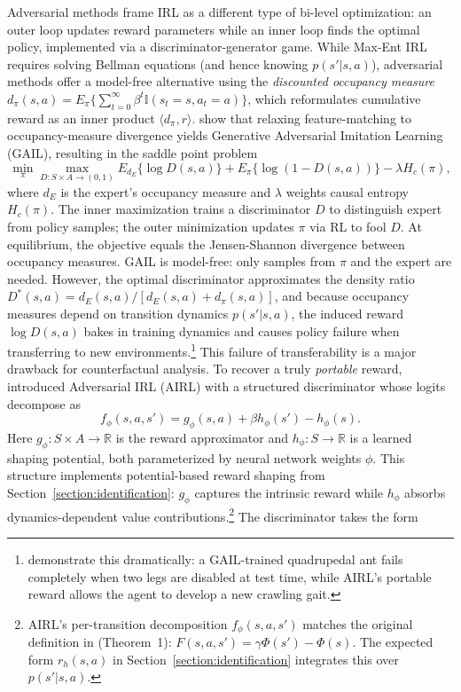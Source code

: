Adversarial methods frame IRL as a different type of bi-level optimization: an outer loop updates reward parameters while an inner loop finds the optimal policy, implemented via a discriminator-generator game. While Max-Ent IRL requires solving Bellman equations (and hence knowing $p(s'|s,a)$), adversarial methods offer a model-free alternative using the \emph{discounted occupancy measure} $d_\pi(s,a) = E_\pi\{\sum_{t=0}^\infty \beta^t \mathbb{I}(s_t=s, a_t=a)\}$, which reformulates cumulative reward as an inner product $\langle d_\pi, r \rangle$. \citet{ho:2016} show that relaxing feature-matching to occupancy-measure divergence yields Generative Adversarial Imitation Learning (GAIL), resulting in the saddle point problem
\begin{equation}
    \min_\pi \max_{D: S \times A \to (0,1)} E_{d_E}\{\log D(s,a)\} + E_\pi\{\log(1-D(s,a))\} - \lambda H_c(\pi),
\label{eq:gail_saddle}
\end{equation}
where $d_E$ is the expert's occupancy measure and $\lambda$ weights causal entropy $H_c(\pi)$. The inner maximization trains a discriminator $D$ to distinguish expert from policy samples; the outer minimization updates $\pi$ via RL to fool $D$. At equilibrium, the objective equals the Jensen-Shannon divergence between occupancy measures. GAIL is model-free: only samples from $\pi$ and the expert are needed. However, the optimal discriminator approximates the density ratio $D^*(s,a) = d_E(s,a)/[d_E(s,a) + d_\pi(s,a)]$, and because occupancy measures depend on transition dynamics $p(s'|s,a)$, the induced reward $\log D(s,a)$ bakes in training dynamics and causes policy failure when transferring to new environments.\footnote{\footnotesize \citet{fu:2018} demonstrate this dramatically: a GAIL-trained quadrupedal ant fails completely when two legs are disabled at test time, while AIRL's portable reward allows the agent to develop a new crawling gait.} This failure of transferability is a major drawback for counterfactual analysis. To recover a truly \emph{portable} reward, \citet{fu:2018} introduced Adversarial IRL (AIRL) with a structured discriminator whose logits decompose as
\begin{equation}
    f_\phi(s,a,s') = g_\phi(s,a) + \beta h_\phi(s') - h_\phi(s).
\label{eq:airl_decomp}
\end{equation}
Here $g_\phi: S \times A \to \mathbb{R}$ is the reward approximator and $h_\phi: S \to \mathbb{R}$ is a learned shaping potential, both parameterized by neural network weights $\phi$. This structure implements potential-based reward shaping from Section~\ref{section:identification}: $g_\phi$ captures the intrinsic reward while $h_\phi$ absorbs dynamics-dependent value contributions.\footnote{\footnotesize AIRL's per-transition decomposition $f_\phi(s,a,s')$ matches the original definition in \citet{nhr:1999} (Theorem~1): $F(s,a,s')=\gamma\Phi(s')-\Phi(s)$. The expected form $r_h(s,a)$ in Section~\ref{section:identification} integrates this over $p(s'|s,a)$.} The discriminator takes the form
